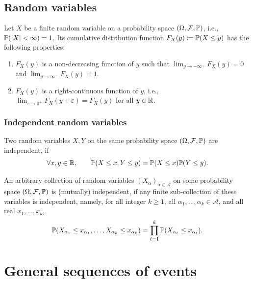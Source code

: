 \documentclass[10pt, a4paper]{article}
\begin{document}
\subsection{Random variables}

\begin{lemma}
    Let $X$ be a finite random variable on a probability space $(\Omega, \mathcal{F}, \P)$,
    i.e.,
    $\P(|X| < \infty) = 1$.
    Its cumulative distribution function $F_{X}(y) \coloneqq \P(X \leq y)$ has the following properties:
    \begin{enumerate}[label = (\alph*)]
        \item $F_{X}(y)$ is a non-decreasing function of $y$ such that $\lim_{y \to -\infty ^ {+}}F_{X}(y) = 0$ and $\lim_{y \to \infty ^ {-}}F_{X}(y) = 1$.

        \item $F_{X}(y)$ is a right-continuous function of $y$,
        i.e.,
        $\lim_{\varepsilon \to 0 ^ {+}}F_{X}(y + \varepsilon) = F_{X}(y)$ for all $y \in \R$.
    \end{enumerate}
\end{lemma}

\subsubsection{Independent random variables}
\begin{definition}
    Two random variables $X, Y$ on the same probability space $(\Omega, \mathcal{F}, \P)$ are independent,
    if
    \[
    \forall x, y \in \R,\qquad \P(X \leq x, Y \leq y) = \P(X \leq x)\P(Y \leq y).
    \]
\end{definition}

\begin{definition}
    An arbitrary collection of random variables $(X_{\alpha})_{\alpha \in \mathcal{A}}$ on some probability space $(\Omega, \mathcal{F}, \P)$ is
    (mutually)
    independent,
    if any finite sub-collection of these variables is independent,
    namely,
    for all integer $k \geq 1$,
    all $\alpha_1, \dotsc, \alpha_k \in \mathcal{A}$,
    and all real $x_1, \dotsc, x_k$,
    \[
    \P(X_{\alpha_1} \leq x_{\alpha_1}, \dotsc, X_{\alpha_k} \leq x_{\alpha_k}) = \prod_{\ell = 1}^{k}\P(X_{\alpha_{\ell}} \leq x_{\alpha_{\ell}}).
    \]
\end{definition}

\newpage

\section{General sequences of events}
\end{document}

